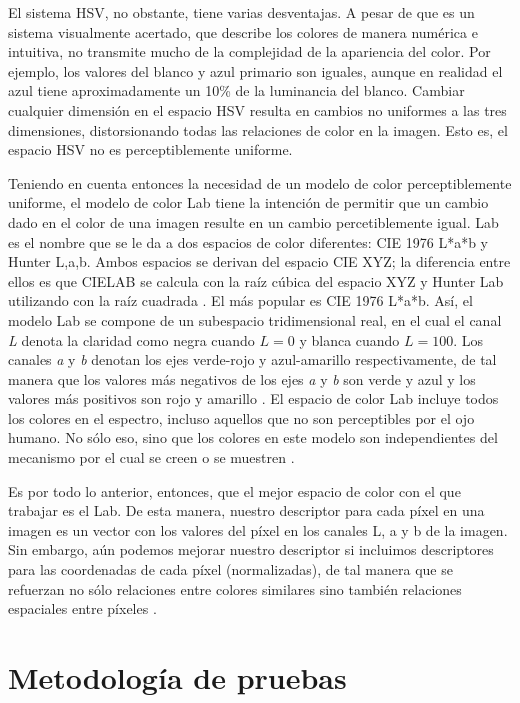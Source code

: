 \documentclass[10pt,twocolumn,letterpaper]{article}
\begin{document}
El sistema HSV, no obstante, tiene varias desventajas. A pesar de que es un sistema visualmente acertado, que describe los colores de manera numérica e intuitiva, no transmite mucho de la complejidad de la apariencia del color. Por ejemplo, los valores del blanco y azul primario son iguales, aunque en realidad el azul tiene aproximadamente un 10\% de la luminancia del blanco. Cambiar cualquier dimensión en el espacio HSV resulta en cambios no uniformes a las tres dimensiones, distorsionando todas las relaciones de color en la imagen. Esto es, el espacio HSV no es perceptiblemente uniforme. 

Teniendo en cuenta entonces la necesidad de un modelo de color perceptiblemente uniforme, el modelo de color Lab tiene la intención de permitir que un cambio dado en el color de una imagen resulte en un cambio percetiblemente igual. Lab es el nombre que se le da a dos espacios de color diferentes: CIE 1976 L*a*b y Hunter L,a,b. Ambos espacios se derivan del espacio CIE XYZ; la diferencia entre ellos es que CIELAB se calcula con la raíz cúbica del espacio XYZ y Hunter Lab utilizando con la raíz cuadrada \cite{5_measuring_color_using_hunter}. El más popular es CIE 1976 L*a*b. Así, el modelo Lab se compone de un subespacio tridimensional real, en el cual el canal \textit{L} denota la claridad como negra cuando $L=0$ y blanca cuando $L=100$. Los canales \textit{a} y \textit{b} denotan los ejes verde-rojo y azul-amarillo respectivamente, de tal manera que los valores más negativos de los ejes \textit{a} y \textit{b} son verde y azul y los valores más positivos son rojo y amarillo \cite{6_explanation_of_the_lab_color_space}. El espacio de color Lab incluye todos los colores en el espectro, incluso aquellos que no son perceptibles por el ojo humano. No sólo eso, sino que los colores en este modelo son independientes del mecanismo por el cual se creen o se muestren \cite{7_mathworks.com}.

Es por todo lo anterior, entonces, que el mejor espacio de color con el que trabajar es el Lab. De esta manera, nuestro descriptor para cada píxel en una imagen es un vector con los valores del píxel en los canales L, a y b de la imagen. Sin embargo, aún podemos mejorar nuestro descriptor si incluimos descriptores para las coordenadas de cada píxel (normalizadas), de tal manera que se refuerzan no sólo relaciones entre colores similares sino también relaciones espaciales entre píxeles \cite{1_forsyth_ponce_2012}.


\section{Metodología de pruebas}
\end{document}
